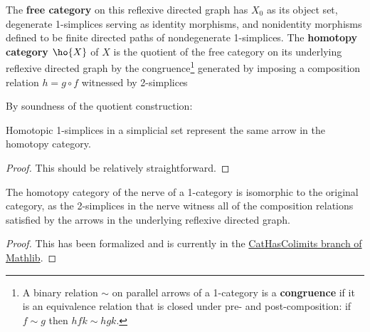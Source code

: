 \begin{definition}\label{defn:homotopy-cat}
    \leanok
 The \textbf{free category} on this reflexive directed graph has $X_0$ as its object set, degenerate 1-simplices serving as identity morphisms, and nonidentity morphisms defined to be finite directed paths of nondegenerate 1-simplices. The \textbf{homotopy category} $\ho{X}$ of $X$ is the quotient of the free category on its underlying reflexive directed graph by the congruence\footnote{A binary relation $\sim$ on parallel arrows of a 1-category is a \textbf{congruence} if it is an equivalence relation that is closed under pre- and post-composition: if $f \sim g$ then $hfk \sim hgk$.} generated by imposing a composition relation $h = g \circ f$ witnessed by 2-simplices
   \begin{center}
   \end{center}
   \end{definition}

By soundness of the quotient construction:

\begin{lem}\label{lem:1-simplex-htpy-in-homotopy-cat}
  Homotopic 1-simplices in a simplicial set represent the same arrow in the homotopy category.
\end{lem}
\begin{proof}
This should be relatively straightforward.
\end{proof}

\begin{proposition}\label{prop:nerve-reflective}
  \leanok
  The homotopy category of the nerve of a 1-category is isomorphic to the original category, as the 2-simplices in the nerve witness all of the composition relations satisfied by the arrows in the underlying reflexive directed graph.
\end{proposition}
\begin{proof}
  \leanok
  This has been formalized and is currently in the \href{https://github.com/leanprover-community/mathlib4/tree/CatHasColimits}{CatHasColimits branch of Mathlib}.
\end{proof}

